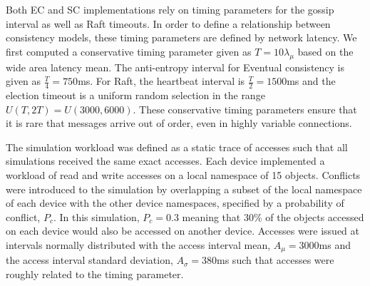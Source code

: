 \documentclass{article}
\begin{document}
Both EC and SC implementations rely on timing parameters for the gossip interval as well as Raft timeouts. In order to define a relationship between consistency models, these timing parameters are defined by network latency. We first computed a conservative timing parameter given as $T=10\lambda_{\mu}$ based on the wide area latency mean. The anti-entropy interval for Eventual consistency is given as $\frac {T} {4} = 750$ms. For Raft, the heartbeat interval is $\frac {T} {2} = 1500$ms and the election timeout is a uniform random selection in the range $U(T, 2T) = U(3000, 6000)$. These conservative timing parameters ensure that it is rare that messages arrive out of order, even in highly variable connections.

The simulation workload was defined as a static trace of accesses such that all simulations received the same exact accesses. Each device implemented a workload of read and write accesses on a local namespace of 15 objects. Conflicts were introduced to the simulation by overlapping a subset of the local namespace of each device with the other device namespaces, specified by a probability of conflict, $P_c$. In this simulation, $P_c=0.3$ meaning that 30\% of the objects accessed on each device would also be accessed on another device. Accesses were issued at intervals normally distributed with the access interval mean, $A_{\mu}=3000$ms and the access interval standard deviation, $A_{\sigma}=380$ms such that accesses were roughly related to the timing parameter.
\end{document}
